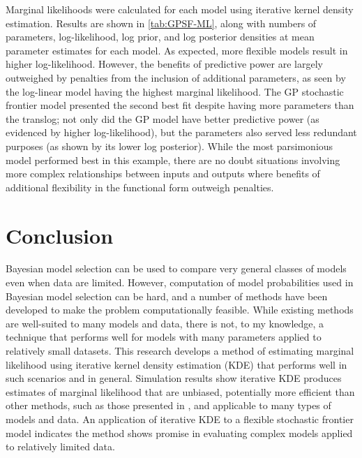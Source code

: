 \documentclass[twocolumn]{article}
\begin{document}
Marginal likelihoods were calculated for each model using iterative kernel density estimation. Results are shown in \cref{tab:GPSF-ML}, along with numbers of parameters, log-likelihood, log prior, and log posterior densities at mean parameter estimates for each model. As expected, more flexible models result in higher log-likelihood. However, the benefits of predictive power are largely outweighed by penalties from the inclusion of additional parameters, as seen by the log-linear model having the highest marginal likelihood. The GP stochastic frontier model presented the second best fit despite having more parameters than the translog; not only did the GP model have better predictive power (as evidenced by higher log-likelihood), but the parameters also served less redundant purposes (as shown by its lower log posterior). While the most parsimonious model performed best in this example, there are no doubt situations involving more complex relationships between inputs and outputs where benefits of additional flexibility in the functional form outweigh penalties.

\section{Conclusion}

Bayesian model selection can be used to compare very general classes of models even when data are limited. However, computation of model probabilities used in Bayesian model selection can be hard, and a number of methods have been developed to make the problem computationally feasible. While existing methods are well-suited to many models and data, there is not, to my knowledge, a technique that performs well for models with many parameters applied to relatively small datasets. This research develops a method of estimating marginal likelihood using iterative kernel density estimation (KDE) that performs well in such scenarios and in general. Simulation results show iterative KDE produces estimates of marginal likelihood that are unbiased, potentially more efficient than other methods, such as those presented in \cite{Chib}, and applicable to many types of models and data. An application of iterative KDE to a flexible stochastic frontier model indicates the method shows promise in evaluating complex models applied to relatively limited data.



\end{document}
